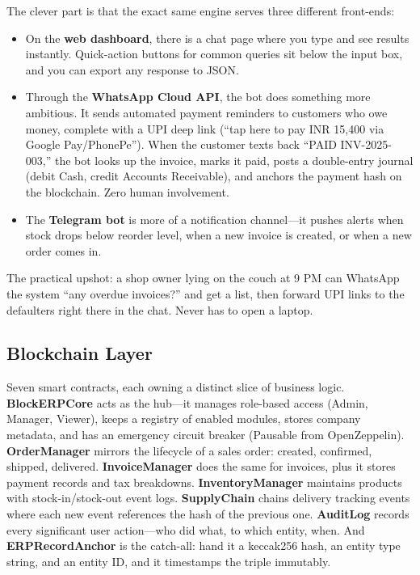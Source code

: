 \documentclass[conference]{IEEEtran}
\begin{document}
The clever part is that the exact same engine serves three different front-ends:
\begin{itemize}
    \item On the \textbf{web dashboard}, there is a chat page where you type and see results instantly. Quick-action buttons for common queries sit below the input box, and you can export any response to JSON.
    \item Through the \textbf{WhatsApp Cloud API}, the bot does something more ambitious. It sends automated payment reminders to customers who owe money, complete with a UPI deep link (``tap here to pay INR 15{,}400 via Google Pay/PhonePe''). When the customer texts back ``PAID INV-2025-003,'' the bot looks up the invoice, marks it paid, posts a double-entry journal (debit Cash, credit Accounts Receivable), and anchors the payment hash on the blockchain. Zero human involvement.
    \item The \textbf{Telegram bot} is more of a notification channel---it pushes alerts when stock drops below reorder level, when a new invoice is created, or when a new order comes in.
\end{itemize}

The practical upshot: a shop owner lying on the couch at 9 PM can WhatsApp the system ``any overdue invoices?'' and get a list, then forward UPI links to the defaulters right there in the chat. Never has to open a laptop.

\subsection{Blockchain Layer}
Seven smart contracts, each owning a distinct slice of business logic. \textbf{BlockERPCore} acts as the hub---it manages role-based access (Admin, Manager, Viewer), keeps a registry of enabled modules, stores company metadata, and has an emergency circuit breaker (Pausable from OpenZeppelin). \textbf{OrderManager} mirrors the lifecycle of a sales order: created, confirmed, shipped, delivered. \textbf{InvoiceManager} does the same for invoices, plus it stores payment records and tax breakdowns. \textbf{InventoryManager} maintains products with stock-in/stock-out event logs. \textbf{SupplyChain} chains delivery tracking events where each new event references the hash of the previous one. \textbf{AuditLog} records every significant user action---who did what, to which entity, when. And \textbf{ERPRecordAnchor} is the catch-all: hand it a keccak256 hash, an entity type string, and an entity ID, and it timestamps the triple immutably.
\end{document}
